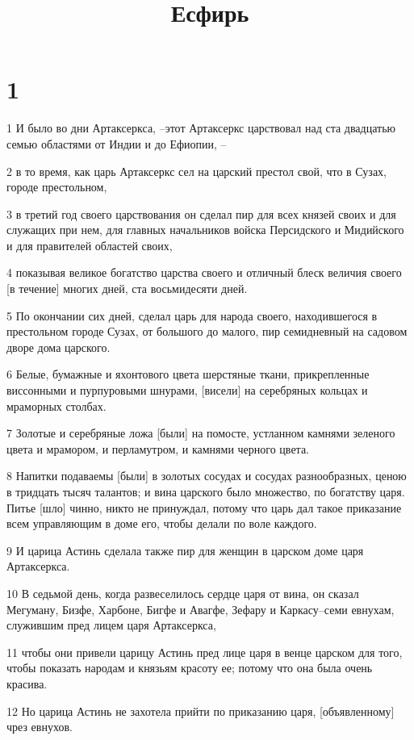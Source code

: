 

\title{Есфирь}


\chapter{1}

\par 1 И было во дни Артаксеркса, --этот Артаксеркс царствовал над ста двадцатью семью областями от Индии и до Ефиопии, --
\par 2 в то время, как царь Артаксеркс сел на царский престол свой, что в Сузах, городе престольном,
\par 3 в третий год своего царствования он сделал пир для всех князей своих и для служащих при нем, для главных начальников войска Персидского и Мидийского и для правителей областей своих,
\par 4 показывая великое богатство царства своего и отличный блеск величия своего [в течение] многих дней, ста восьмидесяти дней.
\par 5 По окончании сих дней, сделал царь для народа своего, находившегося в престольном городе Сузах, от большого до малого, пир семидневный на садовом дворе дома царского.
\par 6 Белые, бумажные и яхонтового цвета шерстяные ткани, прикрепленные виссонными и пурпуровыми шнурами, [висели] на серебряных кольцах и мраморных столбах.
\par 7 Золотые и серебряные ложа [были] на помосте, устланном камнями зеленого цвета и мрамором, и перламутром, и камнями черного цвета.
\par 8 Напитки подаваемы [были] в золотых сосудах и сосудах разнообразных, ценою в тридцать тысяч талантов; и вина царского было множество, по богатству царя. Питье [шло] чинно, никто не принуждал, потому что царь дал такое приказание всем управляющим в доме его, чтобы делали по воле каждого.
\par 9 И царица Астинь сделала также пир для женщин в царском доме царя Артаксеркса.
\par 10 В седьмой день, когда развеселилось сердце царя от вина, он сказал Мегуману, Бизфе, Харбоне, Бигфе и Авагфе, Зефару и Каркасу--семи евнухам, служившим пред лицем царя Артаксеркса,
\par 11 чтобы они привели царицу Астинь пред лице царя в венце царском для того, чтобы показать народам и князьям красоту ее; потому что она была очень красива.
\par 12 Но царица Астинь не захотела прийти по приказанию царя, [объявленному] чрез евнухов.
